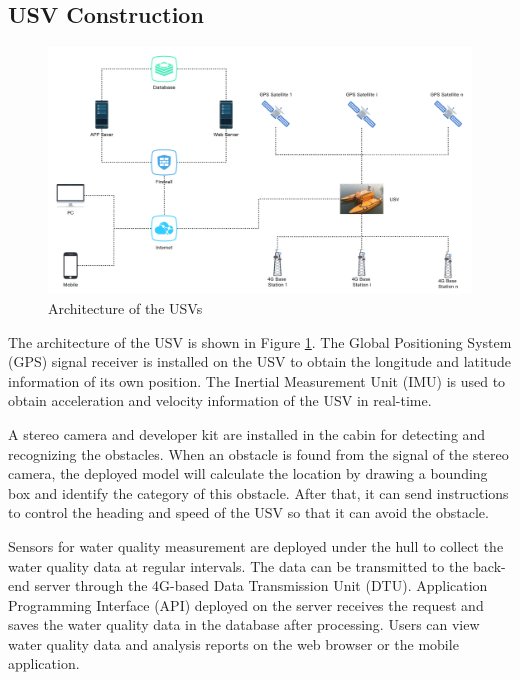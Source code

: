 \documentclass[sensors,article,submit,moreauthors,pdftex]{Definitions/mdpi}
\begin{document}
\begin{paracol}{2}
\subsection{USV Construction}
\begin{figure}[htbp]
\centering
\includegraphics[width=1\columnwidth]{images/USV-architecture.png}
\caption{Architecture of the USVs}
\label{fig:Architecture of USVs}
\end{figure}

The architecture of the USV is shown in Figure \ref{fig:Architecture of USVs}. The Global Positioning System (GPS) signal receiver is installed on the USV to obtain the longitude and latitude information of its own position. The Inertial Measurement Unit (IMU) is used to obtain acceleration and velocity information of the USV in real-time.

A stereo camera and developer kit are installed in the cabin for detecting and recognizing the obstacles. When an obstacle is found from the signal of the stereo camera, the deployed model will calculate the location by drawing a bounding box and identify the category of this obstacle. After that, it can send instructions to control the heading and speed of the USV so that it can avoid the obstacle.

Sensors for water quality measurement are deployed under the hull to collect the water quality data at regular intervals. The data can be transmitted to the back-end server through the 4G-based Data Transmission Unit (DTU). Application Programming Interface (API) deployed on the server receives the request and saves the water quality data in the database after processing. Users can view water quality data and analysis reports on the web browser or the mobile application.




\end{paracol}
\end{document}
